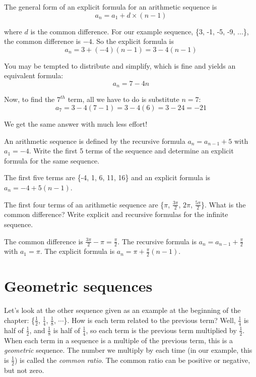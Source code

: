 The general form of an explicit formula for an arithmetic sequence is 
$$a_n = a_1 + d \times (n-1)$$

where $d$ is the common difference. For our example sequence, \{3, -1, 
-5, -9, ...\}, the common difference is $-4$. So the explicit formula 
is
$$a_n = 3 + (-4)(n-1) = 3 - 4(n-1)$$

You may be tempted to distribute and simplify, which is fine and 
yields an equivalent formula:
$$a_n = 7-4n$$

Now, to find the $7^{th}$ term, all we have to do is substitute $n=7$:
$$a_7 = 3 - 4(7 - 1) = 3 - 4(6) = 3 - 24 = -21$$

We get the same answer with much less effort!

\begin{Exercise}[label=seq2]
An arithmetic sequence is defined by the recursive formula $a_n = 
a_{n-1} + 5$ with $a_1 = -4$. Write the first 5 terms of the sequence 
and determine an explicit formula for the same sequence.
\end{Exercise}

\begin{Answer}[ref=seq2]
The first five terms are \{-4, 1, 6, 11, 16\} and an explicit formula 
is $a_n = -4 + 5(n-1)$. 
\end{Answer}

\begin{Exercise}[label=seq3]
The first four terms of an arithmetic sequence are \{$\pi$, 
$\frac{3\pi}{2}$, $2\pi$, $\frac{5\pi}{2}$\}. What is the common 
difference? Write explicit and recursive formulas for the infinite 
sequence.
\end{Exercise}

\begin{Answer}[ref=seq3]
The common difference is $\frac{3\pi}{2} - \pi = \frac{\pi}{2}$. The 
recursive formula is $a_n = a_{n-1} + \frac{\pi}{2}$ with $a_1 = \pi$. 
The explicit formula is $a_n = \pi + \frac{\pi}{2}(n-1)$. 
\end{Answer}


\section{Geometric sequences}
Let's look at the other sequence given as an example at the beginning 
of the chapter: \{$\frac{1}{2}$, $\frac{1}{4}$, $\frac{1}{8}$, 
$\cdots$\}. How is each term related to the previous term? Well, 
$\frac{1}{4}$ is half of $\frac{1}{2}$, and $\frac{1}{8}$ is half of 
$\frac{1}{4}$, so each term is the previous term multiplied by 
$\frac{1}{2}$. When each term in a sequence is a multiple of the 
previous term, this is a \textit{geometric} sequence. The number we 
multiply by each time (in our example, this is $\frac{1}{2}$) is 
called the \textit{common ratio}. The common ratio can be positive 
or negative, but not zero. 

